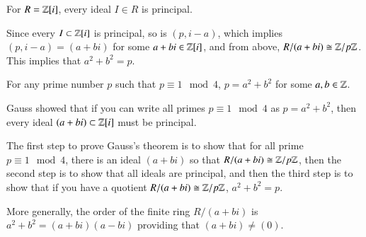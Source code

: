 \begin{theorem}
        For $R = \mathbb Z[i]$, every ideal $I \in R$ is principal.
\end{theorem}

\begin{corollary}
        Since every $I \subset \mathbb Z[i]$ is principal, so is $(p,i-a)$, which implies $(p,i-a) = (a+bi)$ for some $a+bi \in \mathbb Z[i]$, and from above, $R/(a+bi) \cong \mathbb Z/p\mathbb Z$. This implies that $a^2+b^2 = p$.
\end{corollary}


\begin{theorem}
        For any prime number $p$ such that $p \equiv 1 \mod 4$, $p = a^2 + b^2$ for some $a,b \in \mathbb Z$.
\end{theorem}


\begin{remark}
        Gauss showed that if you can write all primes $p\equiv 1 \mod 4$ as $p = a^2 +b^2$, then every ideal $(a+bi) \subset \mathbb Z[i]$ must be principal.
\end{remark}

\begin{remark}
        The first step to prove Gauss's theorem is to show that for all prime $p\equiv 1 \mod 4$, there is an ideal $(a+bi)$ so that $R/(a+bi) \cong \mathbb Z/p\mathbb Z$, then the second step is to show that all ideals are principal, and then the third step is to show that if you have a quotient $R/(a+bi) \cong \mathbb Z/p\mathbb Z$, $a^2+b^2 = p$.
\end{remark}


\begin{remark}
        More generally, the order of the finite ring $R/(a+bi)$ is $a^2+b^2 = (a+bi)(a-bi)$ providing that $(a+bi) \neq (0)$.
\end{remark}
